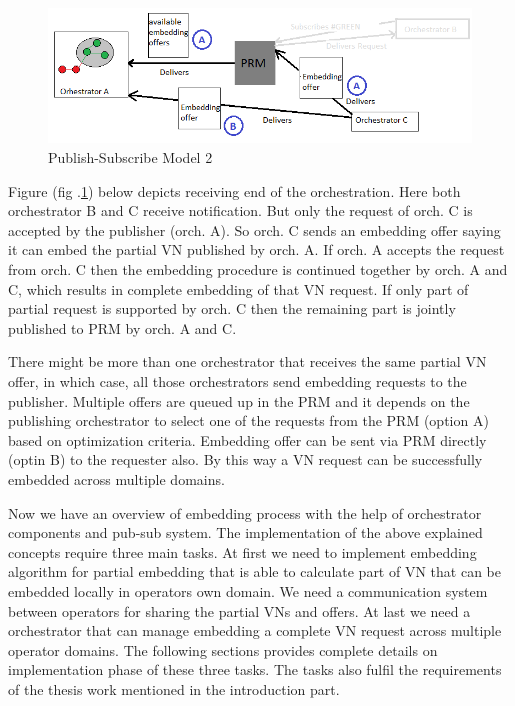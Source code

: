\documentclass[article,dr=phil,type=msc ,colorback,accentcolor=tud4b]{tudthesis}
\begin{document}
\begin{figure}[h]
	\centering
	\includegraphics[width=\linewidth]{psm2}
	\caption{Publish-Subscribe Model 2}
	\label{psm2}
\end{figure}

 Figure (fig .\ref{psm2}) below depicts receiving end of the orchestration. Here both orchestrator B and C receive notification. But only the request of orch. C is accepted by the publisher (orch. A). So orch. C sends an embedding offer saying it can embed the partial VN published by orch. A. If orch. A accepts the request from orch. C then the embedding procedure is continued together by orch. A and C, which results in complete embedding of that VN request. If only part of partial request is supported by orch. C then the remaining part is jointly published to PRM by orch. A and C.

There might be more than one orchestrator that receives the same partial VN offer, in which case, all those orchestrators send embedding requests to the publisher. Multiple offers are queued up in the PRM and it depends on the publishing orchestrator to select one of the requests from the PRM (option A) based on optimization criteria. Embedding offer can be sent via PRM directly (optin B) to the requester also. By this way a VN request can be successfully embedded across multiple domains.\newline

Now we have an overview of embedding process with the help of orchestrator components and pub-sub system. The implementation of the above explained concepts require three main tasks. At first we need to implement embedding algorithm for partial embedding that is able to calculate part of VN that can be embedded locally in operators own domain. We need a communication system between operators for sharing the partial VNs and offers. At last we need a orchestrator that can manage embedding a complete VN request across multiple operator domains. The following sections provides complete details on implementation phase of these three tasks. The tasks also fulfil the requirements of the thesis work mentioned in the introduction part.
\end{document}

